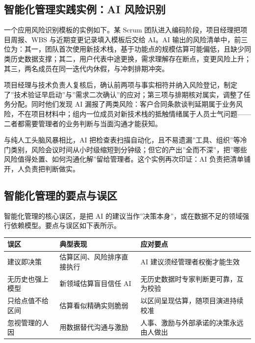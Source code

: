 \documentclass[
]{ctexbook}
\newcounter{none}
\begin{document}
\subsection{智能化管理实践实例：AI
风险识别}\label{ux667aux80fdux5316ux7ba1ux7406ux5b9eux8df5ux5b9eux4f8bai-ux98ceux9669ux8bc6ux522b}

一个应用风险识别模板的实例如下。某 Scrum
团队进入编码阶段，项目经理把项目周报、WBS 与近期变更记录填入模板后交给
AI。AI
输出的风险清单中，前三位为：其一，团队首次使用新技术栈，基于功能点的规模估算可能偏低，且缺少同类历史数据支撑；其二，用户代表中途更换，需求理解存在断点，变更风险上升；其三，两名成员在同一迭代内休假，与冲刺排期冲突。

项目经理与技术负责人复核后，确认前两项与事实相符并纳入风险登记，制定了''技术验证早启动''与''需求二次确认''的应对；第三项与排期核对属实，调整了任务分配。同时他们发现
AI
漏报了两类风险：客户合同条款谈判延期属于业务风险，不在项目材料中；组内一位成员对新技术栈的抵触情绪属于人员士气问题------二者都需要管理者的业务判断与当面沟通才能获知。

与纯人工头脑风暴相比，AI
把检查表扫描自动化，且不易遗漏''工具、组织''等冷门类别，风险会议时间从小时级缩短到分钟级；但它的产出''全而不深''，把''哪些风险值得处置、如何沟通化解''留给管理者。这个实例再次印证：AI
负责把清单铺开，人负责把判断做实。

\subsection{智能化管理的要点与误区}\label{ux667aux80fdux5316ux7ba1ux7406ux7684ux8981ux70b9ux4e0eux8befux533a}

智能化管理的核心误区，是把 AI
的建议当作''决策本身''，或在数据不足的领域强行依赖模型。要点与误区如下表所示。

{\def\LTcaptype{none} %
\begin{longtable}[]{@{}
  >{\raggedright\arraybackslash}p{}
  >{\raggedright\arraybackslash}p{}
  >{\raggedright\arraybackslash}p{}@{}}
\toprule\noalign{}
\begin{minipage}[b]{\linewidth}\raggedright
误区
\end{minipage} & \begin{minipage}[b]{\linewidth}\raggedright
典型表现
\end{minipage} & \begin{minipage}[b]{\linewidth}\raggedright
应对要点
\end{minipage} \\
\midrule\noalign{}
\endhead
\bottomrule\noalign{}
\endlastfoot
建议即决策 & 估算区间、风险排序直接执行 & AI
建议须经管理者权衡才能生效 \\
无历史也强上模型 & 新领域估算盲目信任 AI &
无历史数据时专家判断更可靠，互为校验 \\
只给点值不给区间 & 估算看似精确实则脆弱 &
以区间呈现估算，随项目演进持续校准 \\
忽视管理的人因 & 用数据替代沟通与激励 &
人事、激励与外部承诺的决策永远由人做出 \\
\end{longtable}
}
\end{document}
